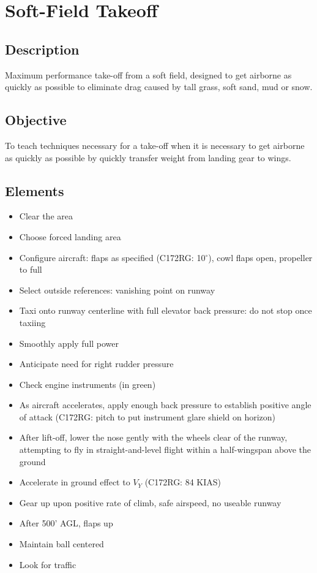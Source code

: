 \section{Soft-Field Takeoff}

\subsection{Description}

Maximum performance take-off from a soft field, designed to get airborne as
quickly as possible to eliminate drag caused by tall grass, soft sand, mud or
snow.

\subsection{Objective}

To teach techniques necessary for a take-off when it is necessary to get
airborne as quickly as possible by quickly transfer weight from landing gear to
wings.

\subsection{Elements}

\begin{itemize}
  \item Clear the area
  \item Choose forced landing area
  \item Configure aircraft: flaps as specified (C172RG: 10$^\circ$), cowl flaps
    open, propeller to full
  \item Select outside references: vanishing point on runway
  \item Taxi onto runway centerline with full elevator back pressure: do not
    stop once taxiing
  \item Smoothly apply full power
  \item Anticipate need for right rudder pressure
  \item Check engine instruments (in green)
  \item As aircraft accelerates, apply enough back pressure to establish
    positive angle of attack (C172RG: pitch to put instrument glare shield on
    horizon)
  \item After lift-off, lower the nose gently with the wheels clear of the
    runway, attempting to fly in straight-and-level flight within a
    half-wingspan above the ground
  \item Accelerate in ground effect to $V_Y$ (C172RG: 84 KIAS)
  \item Gear up upon positive rate of climb, safe airspeed, no useable runway 
  \item After 500' AGL, flaps up
  \item Maintain ball centered 
  \item Look for traffic
\end{itemize}

